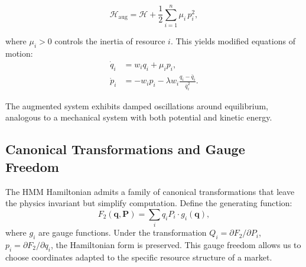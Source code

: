 \begin{equation}
\mathcal{H}_{\text{aug}} = \mathcal{H} + \frac{1}{2} \sum_{i=1}^n \mu_i \, p_i^2,
\label{eq:augmented}
\end{equation}

where $\mu_i > 0$ controls the inertia of resource $i$. This yields modified equations of motion:
\begin{align}
\dot{q}_i &= w_i q_i + \mu_i p_i, \\
\dot{p}_i &= -w_i p_i - \lambda w_i \frac{q_i - \bar{q}_i}{\bar{q}_i^2}.
\end{align}

The augmented system exhibits damped oscillations around equilibrium, analogous to a mechanical system with both potential and kinetic energy.

\subsection{Canonical Transformations and Gauge Freedom}

The HMM Hamiltonian admits a family of canonical transformations that leave the physics invariant but simplify computation. Define the generating function:
\begin{equation}
F_2(\bm{q}, \bm{P}) = \sum_i q_i P_i \cdot g_i(\bm{q}),
\end{equation}
where $g_i$ are gauge functions. Under the transformation $Q_i = \partial F_2 / \partial P_i$, $p_i = \partial F_2 / \partial q_i$, the Hamiltonian form is preserved. This gauge freedom allows us to choose coordinates adapted to the specific resource structure of a market.

